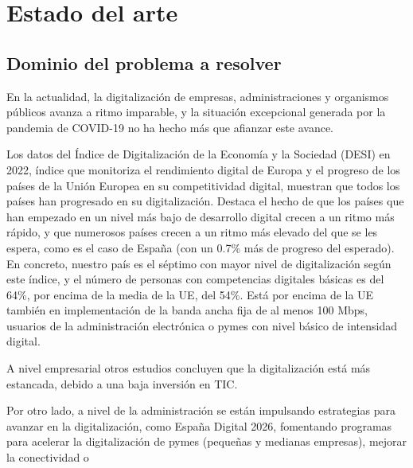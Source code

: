 \chapter{Estado del arte}


\section{Dominio del problema a resolver}

En la actualidad, la digitalización de empresas, administraciones y organismos públicos avanza a ritmo imparable, y la situación excepcional generada por la pandemia de COVID-19 no ha hecho más que afianzar este avance.

Los datos del Índice de Digitalización de la Economía y la Sociedad (DESI) en 2022\cite{desiUE}, índice que monitoriza el rendimiento digital de Europa y el progreso de los países de la Unión Europea en su competitividad digital, muestran que todos los países han progresado en su digitalización. Destaca el hecho de que los países que han empezado en un nivel más bajo de desarrollo digital crecen a un ritmo más rápido, y que numerosos países crecen a un ritmo más elevado del que se les espera, como es el caso de España\cite{desiSpain} (con un 0.7\% más de progreso del esperado).
En concreto, nuestro país es el séptimo con mayor nivel de digitalización según este índice, y el número de personas con competencias digitales básicas es del 64\%, por encima de la media de la UE, del 54\%. Está por encima de la UE también en implementación de la banda ancha fija de al menos 100 Mbps, usuarios de la administración electrónica o pymes con nivel básico de intensidad digital.


A nivel empresarial otros estudios concluyen que la digitalización está más estancada\cite{digitalizacionEmpresaUGT}, debido a una baja inversión en TIC.

Por otro lado, a nivel de la administración se están impulsando estrategias para avanzar en la digitalización, como España Digital 2026\cite{espanaDigital2026}, fomentando programas para acelerar la digitalización de pymes (pequeñas y medianas empresas), mejorar la conectividad o 

